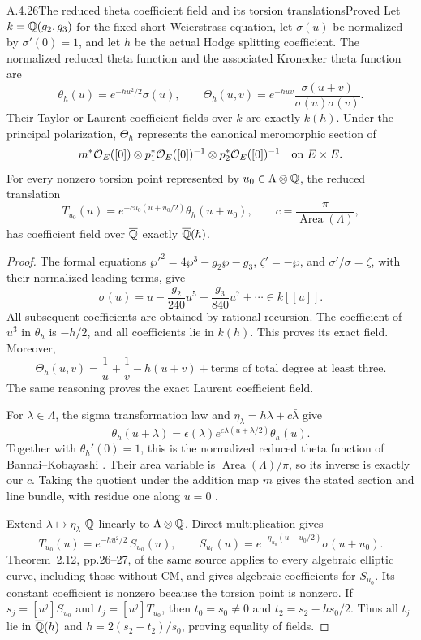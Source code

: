 \begin{result}{A.4.26}{The reduced theta coefficient field and its torsion translations}{Proved}
Let $k=\mathbb Q(g_2,g_3)$ for the fixed short Weierstrass equation, let $\sigma(u)$ be normalized by $\sigma'(0)=1$, and let $h$ be the actual Hodge splitting coefficient. The normalized reduced theta function and the associated Kronecker theta function are
\[
 \theta_h(u)=e^{-hu^2/2}\sigma(u),\qquad
 \Theta_h(u,v)=e^{-huv}\frac{\sigma(u+v)}{\sigma(u)\sigma(v)}.
\]
Their Taylor or Laurent coefficient fields over $k$ are exactly $k(h)$. Under the principal polarization, $\Theta_h$ represents the canonical meromorphic section of
\[
 m^*\mathcal O_E([0])\otimes
 p_1^*\mathcal O_E([0])^{-1}\otimes
 p_2^*\mathcal O_E([0])^{-1}
 \quad\hbox{on }E\times E.
\]
For every nonzero torsion point represented by $u_0\in\Lambda\otimes\mathbb Q$, the reduced translation
\[
 T_{u_0}(u)=
 e^{-c\bar u_0(u+u_0/2)}\theta_h(u+u_0),
 \qquad c=\frac{\pi}{\operatorname{Area}(\Lambda)},
\]
has coefficient field over $\overline{\mathbb Q}$ exactly $\overline{\mathbb Q}(h)$.
\end{result}
\begin{proof}
The formal equations $\wp'^2=4\wp^3-g_2\wp-g_3$, $\zeta'=-\wp$, and $\sigma'/\sigma=\zeta$, with their normalized leading terms, give
\[
 \sigma(u)=u-\frac{g_2}{240}u^5-\frac{g_3}{840}u^7+\cdots\in k[[u]].
\]
All subsequent coefficients are obtained by rational recursion. The coefficient of $u^3$ in $\theta_h$ is $-h/2$, and all coefficients lie in $k(h)$. This proves its exact field. Moreover,
\[
 \Theta_h(u,v)=\frac1u+\frac1v-h(u+v)
       +\text{terms of total degree at least three}.
\]
The same reasoning proves the exact Laurent coefficient field.

For $\lambda\in\Lambda$, the sigma transformation law and
$\eta_\lambda=h\lambda+c\bar\lambda$ give
\[
 \theta_h(u+\lambda)
 =\epsilon(\lambda)
   e^{c\bar\lambda(u+\lambda/2)}\theta_h(u).
\]
Together with $\theta_h'(0)=1$, this is the normalized reduced theta function of Bannai--Kobayashi \cite[Example 1.9, pp.10--11]{EllBannaiKobayashi2010}. Their area variable is $\operatorname{Area}(\Lambda)/\pi$, so its inverse is exactly our $c$. Taking the quotient under the addition map $m$ gives the stated section and line bundle, with residue one along $u=0$ \cite[Example 1.10, pp.11--12]{EllBannaiKobayashi2010}.

Extend $\lambda\mapsto\eta_\lambda$ $\mathbb Q$-linearly to $\Lambda\otimes\mathbb Q$. Direct multiplication gives
\[
 T_{u_0}(u)=e^{-hu^2/2}\,S_{u_0}(u),\qquad
 S_{u_0}(u)=e^{-\eta_{u_0}(u+u_0/2)}\sigma(u+u_0).
\]
Theorem~2.12, pp.26--27, of the same source applies to every algebraic elliptic curve, including those without CM, and gives algebraic coefficients for $S_{u_0}$. Its constant coefficient is nonzero because the torsion point is nonzero. If $s_j=[u^j]S_{u_0}$ and $t_j=[u^j]T_{u_0}$, then
$t_0=s_0\ne0$ and $t_2=s_2-hs_0/2$. Thus all $t_j$ lie in $\overline{\mathbb Q}(h)$ and $h=2(s_2-t_2)/s_0$, proving equality of fields.
\end{proof}

